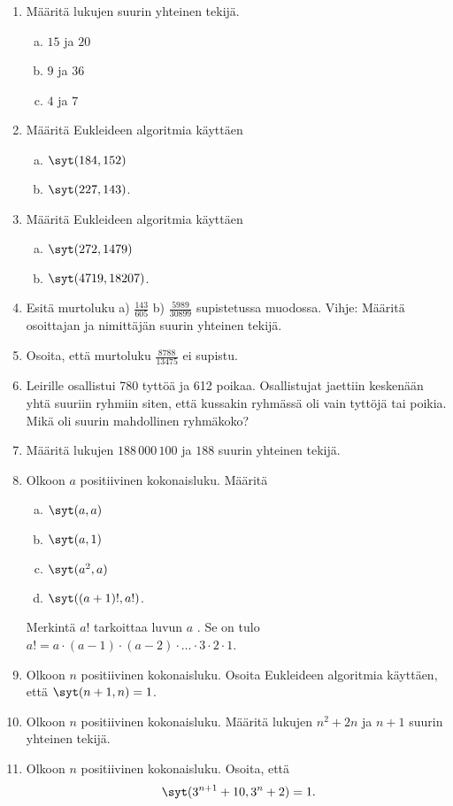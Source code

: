 \begin{enumerate}

\item Määritä lukujen suurin yhteinen tekijä.
\begin{enumerate}[a)]
\item $15$ ja $20$
\item $9$ ja $36$
\item $4$ ja $7$
\end{enumerate}

\item Määritä Eukleideen algoritmia käyttäen
\begin{enumerate}[a)]
\item $\syt(184, 152)$
\item $\syt(227, 143)$.
\end{enumerate}

\item Määritä Eukleideen algoritmia käyttäen
\begin{enumerate}[a)]
\item $\syt(272, 1479)$
\item $\syt(4719, 18207)$.
\end{enumerate}

\item Esitä murtoluku  a) $\frac{143}{605}$  b) $\frac{5989}{30899}$  supistetussa muodossa. Vihje: Määritä osoittajan ja nimittäjän suurin yhteinen tekijä.

\item Osoita, että murtoluku $\frac{8788}{13475}$ ei supistu.

\item Leirille osallistui 780 tyttöä ja 612 poikaa. Osallistujat jaettiin keskenään yhtä suuriin ryhmiin siten, että kussakin ryhmässä oli vain tyttöjä tai poikia. Mikä oli suurin mahdollinen ryhmäkoko?

\item
Määritä lukujen $188\, 000\, 100$ ja $188$ suurin yhteinen tekijä.

\item Olkoon $a$ positiivinen kokonaisluku. Määritä
\begin{enumerate}[a)]
\item $\syt(a, a)$
\item $\syt(a, 1)$
\item $\syt(a^2, a)$
\item $\syt((a+1)!, a!)$.
\end{enumerate}
Merkintä $a!$ tarkoittaa luvun $a$ . Se on tulo $a! = a \cdot (a-1) \cdot (a-2) \cdot \ldots \cdot 3 \cdot 2 \cdot 1$.

\item Olkoon $n$ positiivinen kokonaisluku. Osoita Eukleideen algoritmia käyttäen, että $\syt(n+1, n)=1$.

\item Olkoon $n$ positiivinen kokonaisluku. Määritä lukujen $n^2 + 2n$ ja $n + 1$ suurin yhteinen tekijä.

\item Olkoon $n$ positiivinen kokonaisluku. Osoita, että
\[
\syt(3^{n+1} + 10, 3^n + 2)=1.
\]

\end{enumerate}

